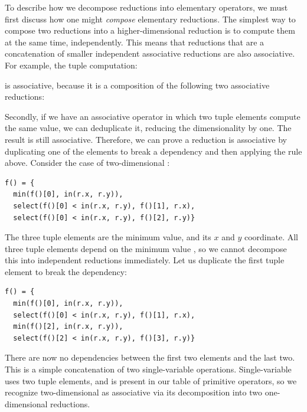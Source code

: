 To describe how we decompose reductions into elementary operators, we must first discuss how one might \emph{compose} elementary reductions. The simplest way to compose two reductions into a higher-dimensional reduction is to compute them at the same time, independently. This means that reductions that are a concatenation of smaller independent associative reductions are also associative. For example, the tuple computation:


is associative, because it is a composition of the following two associative reductions:



Secondly, if we have an associative operator in which two tuple elements compute the same value, we can deduplicate it, reducing the dimensionality by one. The result is still associative. Therefore, we can prove a reduction is associative by duplicating one of the elements to break a dependency and then applying the rule above. Consider the case of two-dimensional :

\begin{lstlisting}
f() = {
  min(f()[0], in(r.x, r.y)),
  select(f()[0] < in(r.x, r.y), f()[1], r.x),
  select(f()[0] < in(r.x, r.y), f()[2], r.y)}
\end{lstlisting}

The three tuple elements are the minimum value, and its $x$ and $y$ coordinate. All three tuple elements depend on the minimum value , so we cannot decompose this into independent reductions immediately. Let us duplicate the first tuple element to break the dependency:

\begin{lstlisting}
f() = {
  min(f()[0], in(r.x, r.y)),
  select(f()[0] < in(r.x, r.y), f()[1], r.x),
  min(f()[2], in(r.x, r.y)),
  select(f()[2] < in(r.x, r.y), f()[3], r.y)}
\end{lstlisting}

There are now no dependencies between the first two elements and the last two. This is a simple concatenation of two single-variable  operations. Single-variable  uses two tuple elements, and is present in our table of primitive operators, so we recognize two-dimensional  as associative via its decomposition into two one-dimensional  reductions.

